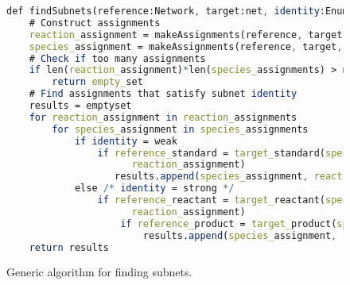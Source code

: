 \documentclass{article}
\begin{document}
\begin{figure}[hbtp]
    \caption{Generic algorithm for finding subnets.}
    \label{code.1}
    \begin{lstlisting}[language=Mathematica,frame=single]
def findSubnets(reference:Network, target:net, identity:Enum, max_num_assignments:int)
    # Construct assignments
    reaction_assignment = makeAssignments(reference, target, reaction_constraints)
    species_assignment = makeAssignments(reference, target, species_constraints)
    # Check if too many assignments
    if len(reaction_assignment)*len(species_assignments) > max_num_assignments:
        return empty_set
    # Find assignments that satisfy subnet identity
    results = emptyset
    for reaction_assignment in reaction_assignments
        for species_assignment in species_assignments
            if identity = weak
                if reference_standard = target_standard(species_assignment, 
                      reaction_assignment)
                   results.append(species_assignment, reaction_assignment)
            else /* identity = strong */
                if reference_reactant = target_reactant(species_assignment, 
                      reaction_assignment)
                    if reference_product = target_product(species_assignment, reaction_assignment)
                        results.append(species_assignment, reaction_assignment)
    return results
    \end{lstlisting}
\end{figure}
\end{document}
